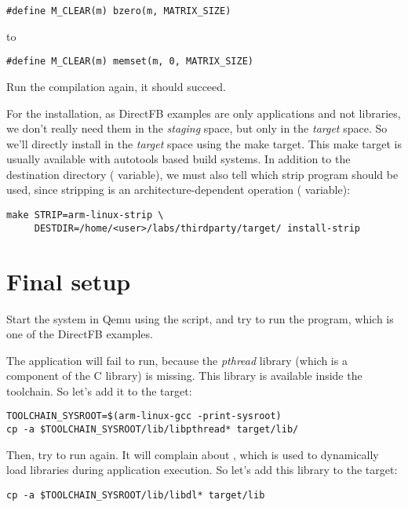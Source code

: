 \begin{verbatim}
#define M_CLEAR(m) bzero(m, MATRIX_SIZE)
\end{verbatim}

to

\begin{verbatim}
#define M_CLEAR(m) memset(m, 0, MATRIX_SIZE)
\end{verbatim}

Run the compilation again, it should succeed.

For the installation, as DirectFB examples are only applications and
not libraries, we don't really need them in the {\em staging} space,
but only in the {\em target} space. So we'll directly install in the
{\em target} space using the  make target. This
make target is usually available with autotools based build
systems. In addition to the destination directory (
variable), we must also tell which strip program should be used, since
stripping is an architecture-dependent operation (
variable):

\begin{verbatim}
make STRIP=arm-linux-strip \
     DESTDIR=/home/<user>/labs/thirdparty/target/ install-strip
\end{verbatim}

\section{Final setup}

Start the system in Qemu using the  script, and try to
run the \code{df_andi} program, which is one of the DirectFB examples.

The application will fail to run, because the {\em pthread} library
(which is a component of the C library) is missing. This library is
available inside the toolchain. So let's add it to the target:

\begin{verbatim}
TOOLCHAIN_SYSROOT=$(arm-linux-gcc -print-sysroot)
cp -a $TOOLCHAIN_SYSROOT/lib/libpthread* target/lib/
\end{verbatim}

Then, try to run  again. It will complain about
, which is used to dynamically load libraries during
application execution. So let's add this library to the target:

\begin{verbatim}
cp -a $TOOLCHAIN_SYSROOT/lib/libdl* target/lib
\end{verbatim}

